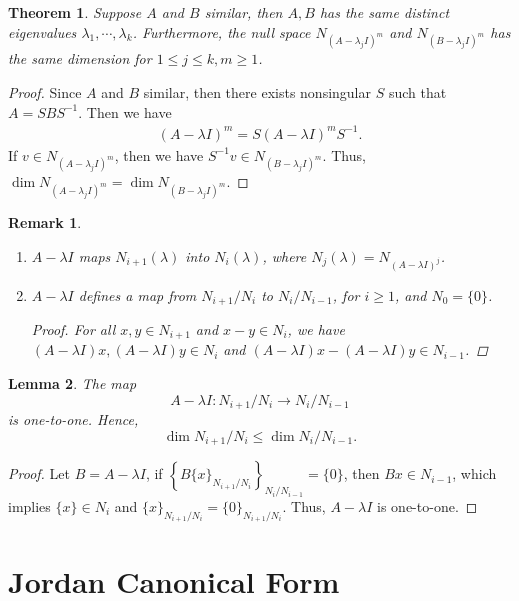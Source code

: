 \documentclass[11pt]{book}
\newtheorem{theorem}{Theorem}[section]
\newtheorem{lemma}[theorem]{Lemma}
\newtheorem{remark}{Remark}[section]
\theoremstyle{definition}
\numberwithin{equation}{subsection}
\begin{document}
\medskip

\begin{theorem}
Suppose $A$ and $B$ similar, then $A, B$ has the same distinct eigenvalues $\lambda_1, \cdots, \lambda_k$. Furthermore, the null space $N_{(A-\lambda_j I)^m}$ and $N_{(B-\lambda_j I)^m}$ has the same dimension for $1\leq j \leq k, m \geq 1$.
\end{theorem}
\begin{proof}
Since $A$ and $B$ similar, then there exists nonsingular $S$ such that $A = SBS^{-1}$. Then we have 
\begin{align*}
    (A - \lambda I)^m = S(A - \lambda I)^m S^{-1}.
\end{align*}
If $v\in N_{(A-\lambda_j I)^m}$, then we have $S^{-1}v\in N_{(B-\lambda_j I)^m}$. Thus, $\dim N_{(A-\lambda_j I)^m} = \dim N_{(B-\lambda_j I)^m}$.
\end{proof}

\begin{remark}
~\begin{enumerate}[label=(\arabic*)]
    \item $A - \lambda I$ maps $N_{i+1}(\lambda)$ into $N_{i}(\lambda)$, where $N_{j}(\lambda) = N_{(A - \lambda I)^j}$.
    \item $A - \lambda I$ defines a map from $N_{i+1}/N_i$ to $N_i/N_{i-1}$, for $i\geq 1$, and $N_0 = \{0\}$.
    \begin{proof}
    For all $x,y\in N_{i+1}$ and $x-y\in N_{i}$, we have $(A - \lambda I)x, (A - \lambda I)y \in N_{i}$ and $(A - \lambda I)x - (A - \lambda I)y \in N_{i-1}$.
    \end{proof}
\end{enumerate}
\end{remark}

\medskip

\begin{lemma}
The map $$A-\lambda I: N_{i+1}/N_i\to N_i/N_{i-1}$$ is one-to-one. Hence, $$\dim N_{i+1}/N_{i} \leq \dim N_{i}/N_{i-1}.$$
\end{lemma}
\begin{proof}
Let $B = A - \lambda I$, if $\left\{B\{x\}_{N_{i+1}/N_{i}} \right\}_{N_{i}/N_{i-1}} = \{0\}$, then $Bx \in N_{i-1}$, which implies $\{x\}\in N_i$ and $\{x\}_{N_{i+1}/N_{i}} = \{0\}_{N_{i+1}/N_{i}}$. Thus, $A - \lambda I$ is one-to-one. 
\end{proof}

\medskip

\section{Jordan Canonical Form}
\end{document}
